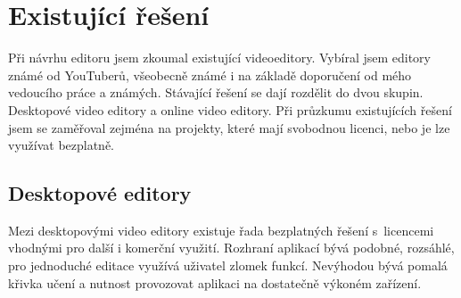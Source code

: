 \chapter{Existující řešení}
Při návrhu editoru jsem zkoumal existující videoeditory. Vybíral jsem editory známé od YouTuberů, všeobecně známé i na základě doporučení od mého vedoucího práce a známých. Stávající řešení se dají rozdělit do dvou skupin. Desktopové video editory a online video editory. Při průzkumu existujících řešení jsem se zaměřoval zejména na projekty, které mají svobodnou licenci, nebo je lze využívat bezplatně.

\section{Desktopové editory}
Mezi desktopovými video editory existuje řada bezplatných řešení s~licencemi vhodnými pro další i komerční využití. Rozhraní aplikací bývá podobné, rozsáhlé, pro jednoduché editace využívá uživatel zlomek funkcí. Nevýhodou bývá pomalá křivka učení a nutnost provozovat aplikaci na dostatečně výkoném zařízení.


